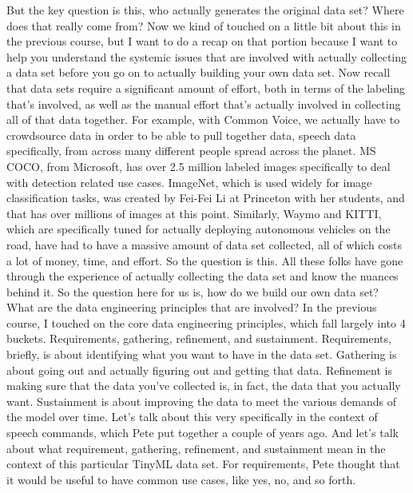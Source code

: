     But the key question is this, who actually
    generates the original data set?
    Where does that really come from?
    Now we kind of touched on a little bit about this in the previous course,
    but I want to do a recap on that portion because I
    want to help you understand the systemic issues that are involved with actually
    collecting a data set before you go on to actually building your own data set.
    Now recall that data sets require a significant amount of effort,
    both in terms of the labeling that's involved,
    as well as the manual effort that's actually involved in collecting
    all of that data together.
    For example, with Common Voice, we actually
    have to crowdsource data in order to be able to pull together data, speech
    data specifically, from across many different people spread
    across the planet.
    MS COCO, from Microsoft, has over 2.5 million
    labeled images specifically to deal with detection related use cases.
    ImageNet, which is used widely for image classification tasks,
    was created by Fei-Fei Li at Princeton with her students,
    and that has over millions of images at this point.
    Similarly, Waymo and KITTI, which are specifically
    tuned for actually deploying autonomous vehicles on the road,
    have had to have a massive amount of data set collected, all of which
    costs a lot of money, time, and effort.
    So the question is this.
    All these folks have gone through the experience
    of actually collecting the data set and know the nuances behind it.
    So the question here for us is, how do we build our own data set?
    What are the data engineering principles that are involved?
    In the previous course, I touched on the core data engineering principles,
    which fall largely into 4 buckets.
    Requirements, gathering, refinement, and sustainment.
    Requirements, briefly, is about identifying
    what you want to have in the data set.
    Gathering is about going out and actually figuring
    out and getting that data.
    Refinement is making sure that the data you've collected is, in fact, the data
    that you actually want.
    Sustainment is about improving the data to meet the various demands
    of the model over time.
    Let's talk about this very specifically in the context of speech
    commands, which Pete put together a couple of years ago.
    And let's talk about what requirement, gathering, refinement, and sustainment
    mean in the context of this particular TinyML data set.
    For requirements, Pete thought that it would
    be useful to have common use cases, like yes, no, and so forth.
